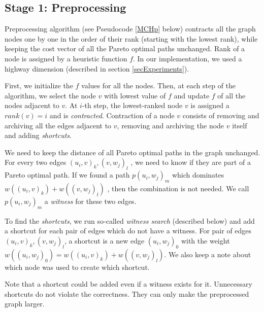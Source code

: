 

\subsection{Stage 1: Preprocessing}
\label{subsecStage1}

Preprocessing algorithm (see Pseudocode \ref{MCHp} below) contracts all the graph nodes one by one in the order of their rank (starting with the lowest rank), while keeping the cost vector of all the Pareto optimal paths unchanged. Rank of a node is assigned by a heuristic function $f$. In our implementation, we used a highway dimension (described in section \ref{secExperiments}).
 
First, we initialize the $f$ values for all the nodes. Then, at each step of the algorithm, we select the node $v$ with lowest value of $f$ and update $f$ of all the nodes adjacent to $v$. 
At $i$-th step, the lowest-ranked node $v$ is assigned a $rank(v) = i$ and is \emph{contracted}. 
Contraction of a node $v$ consists of removing and archiving all the edges adjacent to $v$, removing and archiving the node $v$ itself and adding {\em shortcuts}. 

We need to keep the distance of all Pareto optimal paths in the graph unchanged. For every two edges $(u_i,v)_k,(v,w_j)_l$ , we need to know if they are part of a Pareto optimal path. If we found a path $p(u_i,w_j)_m$ which dominates $w((u_i,v)_k)+w((v,w_j)_l)$ , then the combination is not needed. We call $p(u_i,w_j)_m$ a \emph{witness} for these two edges. 

To find the {\em shortcuts}, we run so-called {\em witness search} (described
below) and add a shortcut for each pair of edges which do not have a witness.
For pair of edges $(u_i,v)_k,(v,w_j)_l$, a  shortcut is a new edge $(u_i,w_j)_0$ 
with the weight $w((u_i,w_j)_0) = w((u_i,v)_k)+w((v,w_j)_l)$. 
We also keep a note about which node was used to create which
shortcut.

Note that a shortcut could be added even if a witness exists for it. Unnecessary shortcuts do not violate the correctness. They can only make the preprocessed graph larger.

